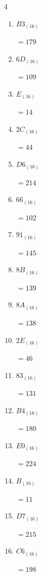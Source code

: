 \begin{multicols}{4}
\begin{enumerate}
        $=41$

  \item $B3_{(16)}$

        $=179$

  \item $6D_{(16)}$

        $=109$

  \item $E_{(16)}$

        $=14$

  \item $2C_{(16)}$

        $=44$

  \item $D6_{(16)}$

        $=214$

  \item $66_{(16)}$

        $=102$

  \item $91_{(16)}$

        $=145$

  \item $8B_{(16)}$

        $=139$

  \item $8A_{(16)}$

        $=138$

  \item $2E_{(16)}$

        $=46$

\columnbreak %

  \item $83_{(16)}$

        $=131$

  \item $B4_{(16)}$

        $=180$

  \item $E0_{(16)}$

        $=224$

  \item $B_{(16)}$

        $=11$

  \item $D7_{(16)}$

        $=215$

  \item $C6_{(16)}$

        $=198$


\end{enumerate}
\end{multicols}
